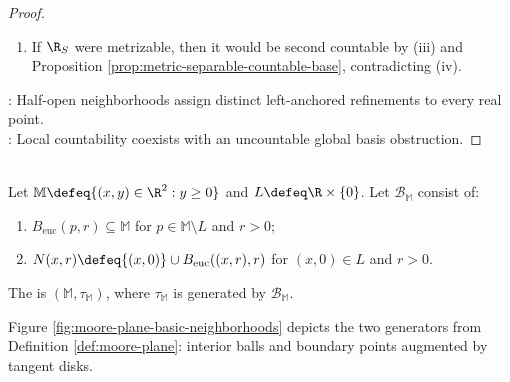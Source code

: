 \begin{counterexample}
\begin{proof}
\begin{enumerate}[label=(\roman*)]
If $x<y$, then $x\in C_x\setminus C_y$, so $C_x\neq C_y$. Thus $x\mapsto C_x$ is injective. The space $\R$ is uncountable by Corollary \ref{cor:closed-intervals-and-reals-uncountable}.\\
Hence $\mathcal{C}$ is not at most countable by Proposition \ref{prop:subsets-and-images-at-most-countable}(i), so $\R_S$ is not second countable.
\item If $\R_S$ were metrizable, then it would be second countable by (iii) and Proposition \ref{prop:metric-separable-countable-base}, contradicting (iv).
\end{enumerate}
: Half-open neighborhoods assign distinct left-anchored refinements to every real point.\\
: Local countability coexists with an uncountable global basis obstruction.
\end{proof}
\end{counterexample}

\begin{definition} \label{def:moore-plane} \\
Let $\mathbb{M}\defeq\{(x,y)\in\R^2:y\geq0\}$ and $L\defeq\R\times\{0\}$. Let $\mathcal{B}_{\mathbb{M}}$ consist of:
\begin{enumerate}[label=(\roman*)]
\setlength{\itemsep}{0pt}
\item $B_{\mathrm{euc}}(p,r)\subseteq\mathbb{M}$ for $p\in\mathbb{M}\setminus L$ and $r>0$;
\item $N(x,r)\defeq\{(x,0)\}\cup B_{\mathrm{euc}}((x,r),r)$ for $(x,0)\in L$ and $r>0$.
\end{enumerate}
The  is $(\mathbb{M},\tau_{\mathbb{M}})$, where $\tau_{\mathbb{M}}$ is generated by $\mathcal{B}_{\mathbb{M}}$.
\end{definition}

\noindent Figure \ref{fig:moore-plane-basic-neighborhoods} depicts the two generators from Definition \ref{def:moore-plane}: interior balls and boundary points augmented by tangent disks.

\begin{illustrationfigure}[H]
  \centering
  
  \caption{The Moore-plane generators are ordinary interior balls and tangent disks augmented by their boundary points.}
  \label{fig:moore-plane-basic-neighborhoods}
\end{illustrationfigure}

